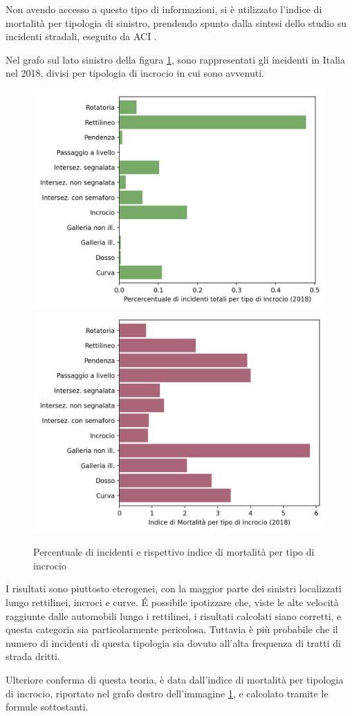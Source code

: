 \documentclass[a4paper,12pt]{report}
\begin{document}
Non avendo accesso a questo tipo di informazioni, si è utilizzato l'indice di 
mortalità per tipologia di sinistro, prendendo spunto dalla sintesi dello 
studio su incidenti stradali, eseguito da ACI \cite{ACI:2}.

Nel grafo sul lato sinistro della figura \ref{fig:tipo-intersezioni}, 
sono rappresentati gli incidenti in Italia nel 2018, divisi per tipologia 
di incrocio in cui sono avvenuti.

\begin{figure}
    \includegraphics[width=0.5\linewidth]{../src/incidenti/incidenti_senza_coords/localizzazione_incidente/intersezioni.png}
    \includegraphics[width=0.5\linewidth]{../src/incidenti/incidenti_senza_coords/localizzazione_incidente/indice_mortalita.png}
    \caption{Percentuale di incidenti e rispettivo indice di mortalità per tipo di incrocio}
    \label{fig:tipo-intersezioni}
\end{figure}

I risultati sono piuttosto eterogenei, con la maggior parte dei sinistri 
localizzati lungo rettilinei, incroci e curve. 
\'E possibile ipotizzare che, viste le alte velocità raggiunte dalle automobili 
lungo i rettilinei, i risultati calcolati siano corretti, e questa categoria sia 
particolarmente pericolosa.
Tuttavia è più probabile che il numero di incidenti di questa tipologia sia dovuto 
all'alta frequenza di tratti di strada dritti.

Ulteriore conferma di questa teoria, è data dall'indice di mortalità per tipologia di incrocio, 
riportato nel grafo destro dell'immagine \ref{fig:tipo-intersezioni}, e calcolato tramite le 
formule sottostanti. 
\end{document}
